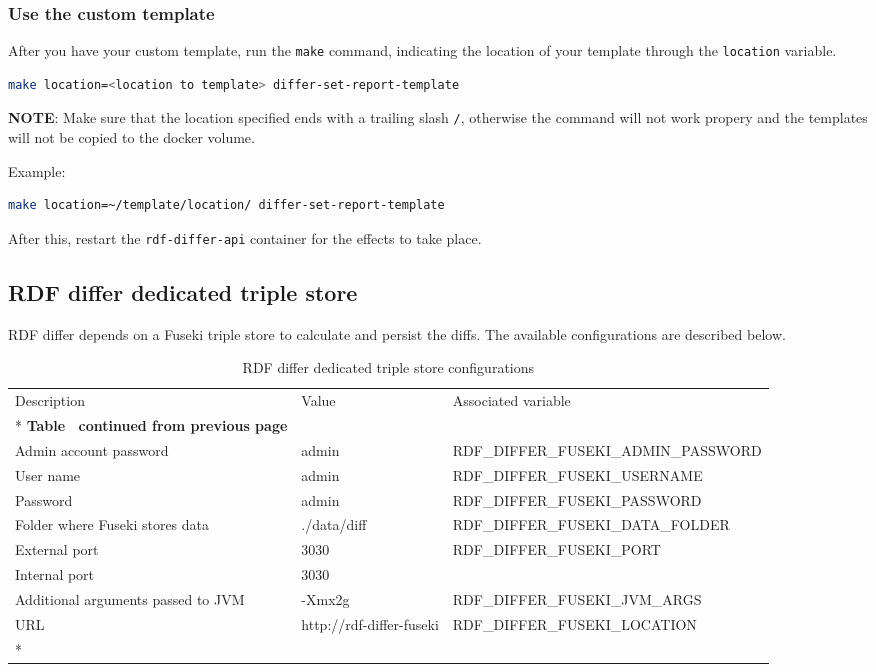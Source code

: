 		\subsubsection{Use the custom template}
		After you have your custom template, run the \texttt{make} command, indicating the location of your template through the \texttt{location} variable.
		\begin{lstlisting}[language=bash]
make location=<location to template> differ-set-report-template
		\end{lstlisting}

		\textbf{NOTE}: Make sure that the location specified ends with a trailing slash \texttt{/}, otherwise the command will not work propery and the templates will not be copied to the docker volume.

		Example:
		\begin{lstlisting}[language=bash]
make location=~/template/location/ differ-set-report-template
		\end{lstlisting}

		After this, restart the \texttt{rdf-differ-api} container for the effects to take place.

	
	\subsection{RDF differ dedicated triple store}
	
	RDF differ depends on a Fuseki triple store to calculate and persist the diffs. The available configurations are described below. 

	\begin{longtable}[c]{@{}p{4cm}p{2cm}l@{}}
		\toprule
		Description & Value & Associated variable \\* \midrule
		\endfirsthead
		\multicolumn{3}{c}%
		{{\bfseries Table \thetable\ continued from previous page}} \\
		\endhead
		\bottomrule
		\endfoot
		\endlastfoot
		Admin account password & admin & RDF\_DIFFER\_FUSEKI\_ADMIN\_PASSWORD \\
		User name & admin & RDF\_DIFFER\_FUSEKI\_USERNAME \\
		Password & admin & RDF\_DIFFER\_FUSEKI\_PASSWORD \\
		Folder where Fuseki stores data & ./data/diff & RDF\_DIFFER\_FUSEKI\_DATA\_FOLDER \\
		External port & 3030 & RDF\_DIFFER\_FUSEKI\_PORT \\
		Internal port & 3030 &  \\
		Additional arguments passed to JVM & -Xmx2g & RDF\_DIFFER\_FUSEKI\_JVM\_ARGS \\
		URL & http://rdf-differ-fuseki & RDF\_DIFFER\_FUSEKI\_LOCATION \\* \bottomrule
		\caption{RDF differ dedicated triple store configurations}
		\label{tab:my-table2}\\
	\end{longtable}
	
